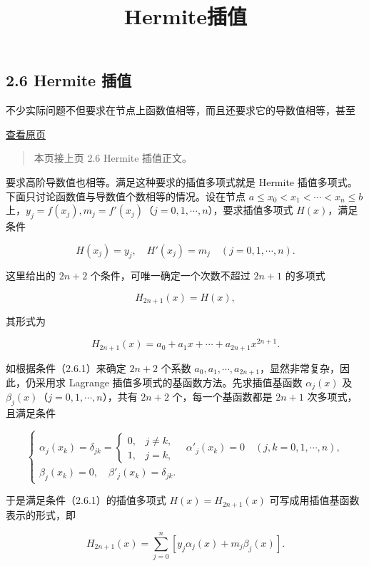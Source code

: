 \documentclass[
  10pt,
  fontset=fandol]{ctexart}
\title{Hermite插值}
\author{}
\date{}
\begin{document}
\maketitle

\subsection{2.6 Hermite 插值}\label{hermite-ux63d2ux503c}

不少实际问题不但要求在节点上函数值相等，而且还要求它的导数值相等，甚至

\href{../../source-images/pdf-043.jpeg}{查看原页}

\begin{quote}
本页接上页 2.6 Hermite 插值正文。
\end{quote}

要求高阶导数值也相等。满足这种要求的插值多项式就是 Hermite 插值多项式。下面只讨论函数值与导数值个数相等的情况。设在节点 \(a\leqslant x_0<x_1<\cdots<x_n\leqslant b\) 上，\(y_j=f(x_j),m_j=f'(x_j)\)（\(j=0,1,\cdots,n\)），要求插值多项式 \(H(x)\)，满足条件

\[
H(x_j)=y_j,\quad H'(x_j)=m_j\quad(j=0,1,\cdots,n).\tag{2.6.1}
\]

这里给出的 \(2n+2\) 个条件，可唯一确定一个次数不超过 \(2n+1\) 的多项式

\[H_{2n+1}(x)=H(x),\]

其形式为

\[H_{2n+1}(x)=a_0+a_1x+\cdots+a_{2n+1}x^{2n+1}.\]

如根据条件（2.6.1）来确定 \(2n+2\) 个系数 \(a_0,a_1,\cdots,a_{2n+1}\)，显然非常复杂，因此，仍采用求 Lagrange 插值多项式的基函数方法。先求插值基函数 \(\alpha_j(x)\) 及 \(\beta_j(x)\)（\(j=0,1,\cdots,n\)），共有 \(2n+2\) 个，每一个基函数都是 \(2n+1\) 次多项式，且满足条件

\[
\begin{cases}
\alpha_j(x_k)=\delta_{jk}=\begin{cases}0,&j\ne k,\\1,&j=k,\end{cases}\quad \alpha'_j(x_k)=0\quad(j,k=0,1,\cdots,n),\\
\beta_j(x_k)=0,\quad \beta'_j(x_k)=\delta_{jk}.
\end{cases}\tag{2.6.2}
\]

于是满足条件（2.6.1）的插值多项式 \(H(x)=H_{2n+1}(x)\) 可写成用插值基函数表示的形式，即

\[H_{2n+1}(x)=\sum_{j=0}^{n}[y_j\alpha_j(x)+m_j\beta_j(x)].\tag{2.6.3}\]
\end{document}
